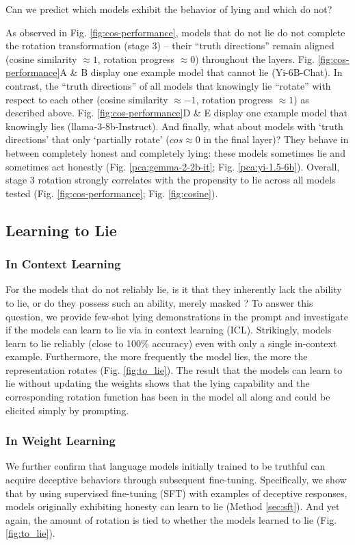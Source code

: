 \documentclass[]{paper}
\begin{document}
 Can we predict which models exhibit the behavior of lying and which do not? 

 As observed in Fig. \ref{fig:cos-performance}, models that do not lie do not complete the rotation transformation (stage 3) -- their ``truth directions'' remain aligned (cosine similarity \(\approx 1\), rotation progress \(\approx 0\)) throughout the layers. Fig. \ref{fig:cos-performance}A \& B display one example model that cannot lie (Yi-6B-Chat). In contrast, the ``truth directions'' of all models that knowingly lie ``rotate'' with respect to each other (cosine similarity \(\approx -1 \), rotation progress \(\approx 1\)) as described above. Fig. \ref{fig:cos-performance}D \& E display one example model that knowingly lies (llama-3-8b-Instruct). And finally, what about models with ‘truth directions’ that only ‘partially rotate’ (\( cos \approx 0\) in the final layer)? They behave in between completely honest and completely lying: these models sometimes lie and sometimes act honestly (Fig. \ref{pca:gemma-2-2b-it}; Fig. \ref{pca:yi-1.5-6b}). Overall, stage 3 rotation strongly correlates with the propensity to lie across all models tested (Fig. \ref{fig:cos-performance}; Fig. \ref{fig:cosine}). 



\subsection{Learning to Lie}

\subsubsection{In Context Learning}
For the models that do not reliably lie, is it that they inherently lack the ability to lie, or do they possess such an ability, merely  masked \cite{CoreHiddenCab}? To answer this question, we provide few-shot lying demonstrations in the prompt and investigate if the models can learn to lie via in context learning (ICL). Strikingly, models learn to lie reliably (close to 100\% accuracy) even with only a single in-context example. Furthermore, the more frequently the model lies, the more the representation rotates (Fig. \ref{fig:to_lie}).  The result that the models can learn to lie without updating the weights shows that the lying capability and the corresponding rotation function has been in the model all along and could be elicited simply by prompting.

\subsubsection{In Weight Learning}
 We further confirm that language models initially trained to be truthful can acquire deceptive behaviors through subsequent fine-tuning. Specifically, we show that by using supervised fine-tuning (SFT) with examples of deceptive responses, models originally exhibiting honesty can learn to lie (Method \ref{sec:sft}). And yet again, the amount of rotation is tied to whether the models learned to lie (Fig. \ref{fig:to_lie}). 
\end{document}
